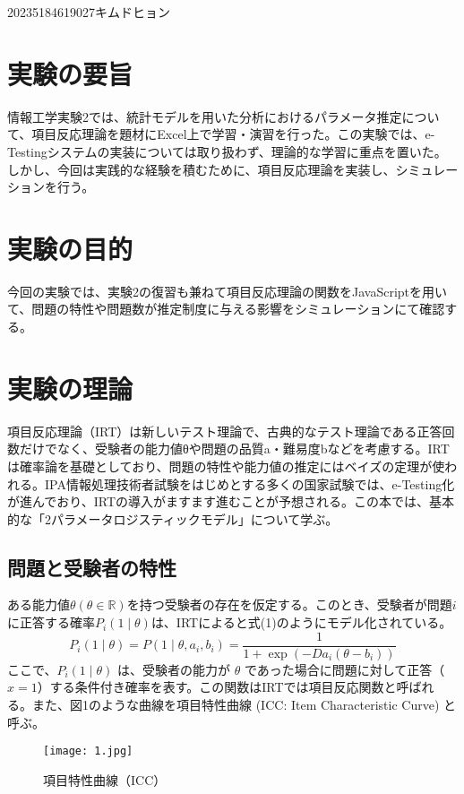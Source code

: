 \documentclass[12pt]{jarticle}
\begin{document}
{2023}{5}{18}{4619027}{キムドヒョン}
{}
{}
{}
{}
{}
{}
{}
\section{実験の要旨}
情報工学実験2では、統計モデルを用いた分析におけるパラメータ推定について、項目反応理論を題材にExcel上で学習・演習を行った。この実験では、e-Testingシステムの実装については取り扱わず、理論的な学習に重点を置いた。しかし、今回は実践的な経験を積むために、項目反応理論を実装し、シミュレーションを行う。

\section{実験の目的}
今回の実験では、実験2の復習も兼ねて項目反応理論の関数をJavaScriptを用いて、問題の特性や問題数が推定制度に与える影響をシミュレーションにて確認する。

\section{実験の理論}
項目反応理論（IRT）は新しいテスト理論で、古典的なテスト理論である正答回数だけでなく、受験者の能力値θや問題の品質a・難易度bなどを考慮する。IRTは確率論を基礎としており、問題の特性や能力値の推定にはベイズの定理が使われる。IPA情報処理技術者試験をはじめとする多くの国家試験では、e-Testing化が進んでおり、IRTの導入がますます進むことが予想される。この本では、基本的な「2パラメータロジスティックモデル」について学ぶ。
\subsection{問題と受験者の特性}
ある能力値$\theta (\theta \in \mathbb{R})$を持つ受験者の存在を仮定する。このとき、受験者が問題$i$に正答する確率$P_i(1 \mid \theta)$は、IRTによると式(1)のようにモデル化されている。
\begin{equation}P_i(1\mid \theta)=P(1 \mid \theta,a_i,b_i)=\frac{1}{1+\exp(-Da_i(\theta-b_i))}\end{equation}
ここで、$P_i(1 \mid \theta)$ は、受験者の能力が $\theta$ であった場合に問題に対して正答（$x=1$）する条件付き確率を表す。この関数はIRTでは項目反応関数と呼ばれる。また、図1のような曲線を項目特性曲線 (ICC: Item Characteristic Curve) と呼ぶ。
\begin{figure}[H]
	\centering
	\texttt{[image: 1.jpg]}
	\caption{項目特性曲線（ICC）}
\end{figure}
\end{document}
